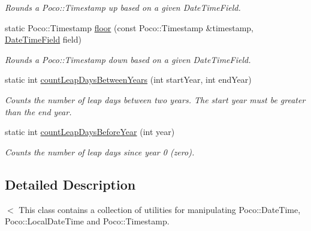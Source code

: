 \begin{DoxyCompactItemize}
\begin{DoxyCompactList}\small\item\em Rounds a Poco\-::\-Timestamp up based on a given Date\-Time\-Field. \end{DoxyCompactList}\item 
\hypertarget{classofx_1_1_time_1_1_utils_af265609987c742f685dd29d936e3bd82}{static Poco\-::\-Timestamp \hyperlink{classofx_1_1_time_1_1_utils_af265609987c742f685dd29d936e3bd82}{floor} (const Poco\-::\-Timestamp \&timestamp, \hyperlink{classofx_1_1_time_1_1_utils_aaab0e5bd305761231f063a0701785112}{Date\-Time\-Field} field)}\label{classofx_1_1_time_1_1_utils_af265609987c742f685dd29d936e3bd82}

\begin{DoxyCompactList}\small\item\em Rounds a Poco\-::\-Timestamp down based on a given Date\-Time\-Field. \end{DoxyCompactList}\item 
\hypertarget{classofx_1_1_time_1_1_utils_ad23f10fcfa1361cace0a26bc9252600e}{static int \hyperlink{classofx_1_1_time_1_1_utils_ad23f10fcfa1361cace0a26bc9252600e}{count\-Leap\-Days\-Between\-Years} (int start\-Year, int end\-Year)}\label{classofx_1_1_time_1_1_utils_ad23f10fcfa1361cace0a26bc9252600e}

\begin{DoxyCompactList}\small\item\em Counts the number of leap days between two years. The start year must be greater than the end year. \end{DoxyCompactList}\item 
\hypertarget{classofx_1_1_time_1_1_utils_a3584234533532b25363feee40bbb187b}{static int \hyperlink{classofx_1_1_time_1_1_utils_a3584234533532b25363feee40bbb187b}{count\-Leap\-Days\-Before\-Year} (int year)}\label{classofx_1_1_time_1_1_utils_a3584234533532b25363feee40bbb187b}

\begin{DoxyCompactList}\small\item\em Counts the number of leap days since year 0 (zero). \end{DoxyCompactList}\end{DoxyCompactItemize}


\subsection{Detailed Description}
$<$ This class contains a collection of utilities for manipulating Poco\-::\-Date\-Time, Poco\-::\-Local\-Date\-Time and Poco\-::\-Timestamp.

